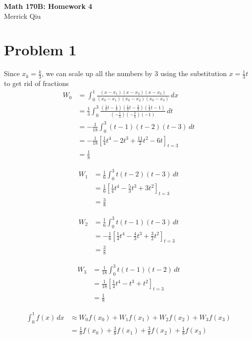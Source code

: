 \documentclass{article}
\begin{document}
\begin{center}
	\huge{\bf Math 170B: Homework 4} \\
	Merrick Qiu
\end{center}

\section*{Problem 1}
Since $x_k = \frac{k}{3}$, we can scale up all the numbers by 3 using the substitution 
$x = \frac{1}{3}t$ to get rid of fractions
\begin{align*}
	W_0 &= \int_0^1 \frac{(x-x_1)(x-x_2)(x-x_3)}{(x_0-x_1)(x_0-x_2)(x_0-x_3)} \,dx\\
	&= \frac{1}{3} \int_0^3 \frac{(\frac{1}{3}t-\frac{1}{3})(\frac{1}{3}t-\frac{2}{3})(\frac{1}{3}t-1)}{(-\frac{1}{3})(-\frac{2}{3})(-1)} \,dt \\
	&= -\frac{1}{18}\int_0^3 (t-1)(t-2)(t-3) \,dt \\
	&= -\frac{1}{18} \left[\frac{1}{4}t^4 -2t^3 + \frac{11}{2}t^2 - 6t\right]_{t=3} \\
	&= \frac{1}{8}
\end{align*}

\begin{align*}
	W_1 &= \frac{1}{6}\int_0^3 t(t-2)(t-3) \,dt \\
	&= \frac{1}{6} \left[\frac{1}{4}t^4 -\frac{5}{3}t^3 + 3t^2\right]_{t=3} \\
	&= \frac{3}{8}
\end{align*}

\begin{align*}
	W_2 &= \frac{1}{6}\int_0^3 t(t-1)(t-3) \,dt \\
	&= -\frac{1}{6} \left[\frac{1}{4}t^4 -\frac{4}{3}t^3 + \frac{3}{2}t^2\right]_{t=3} \\
	&= \frac{3}{8}
\end{align*}

\begin{align*}
	W_3 &= \frac{1}{18} \int_0^3 t(t-1)(t-2) \,dt \\
	&= \frac{1}{18} \left[\frac{1}{4}t^4 - t^3 + t^2\right]_{t=3} \\
	&= \frac{1}{8}
\end{align*}

\begin{align*}
	\int_0^1 f(x) \,dx &\approx W_0 f(x_0) +  W_1 f(x_1) + W_2 f(x_2) + W_3f(x_3) \\
	&= \frac{1}{8} f(x_0) + \frac{3}{8} f(x_1) + \frac{3}{8} f(x_2) + \frac{1}{8} f(x_3)
\end{align*}
\newpage 
\end{document}

